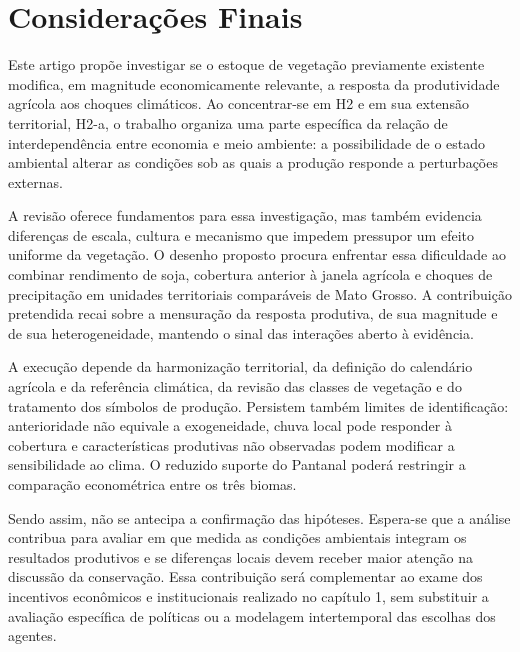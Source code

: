\section{Considerações Finais}

Este artigo propõe investigar se o estoque de vegetação previamente existente modifica, em magnitude economicamente relevante, a resposta da produtividade agrícola aos choques climáticos. Ao concentrar-se em H2 e em sua extensão territorial, H2-a, o trabalho organiza uma parte específica da relação de interdependência entre economia e meio ambiente: a possibilidade de o estado ambiental alterar as condições sob as quais a produção responde a perturbações externas.

A revisão oferece fundamentos para essa investigação, mas também evidencia diferenças de escala, cultura e mecanismo que impedem pressupor um efeito uniforme da vegetação. O desenho proposto procura enfrentar essa dificuldade ao combinar rendimento de soja, cobertura anterior à janela agrícola e choques de precipitação em unidades territoriais comparáveis de Mato Grosso. A contribuição pretendida recai sobre a mensuração da resposta produtiva, de sua magnitude e de sua heterogeneidade, mantendo o sinal das interações aberto à evidência.

A execução depende da harmonização territorial, da definição do calendário agrícola e da referência climática, da revisão das classes de vegetação e do tratamento dos símbolos de produção. Persistem também limites de identificação: anterioridade não equivale a exogeneidade, chuva local pode responder à cobertura e características produtivas não observadas podem modificar a sensibilidade ao clima. O reduzido suporte do Pantanal poderá restringir a comparação econométrica entre os três biomas.

Sendo assim, não se antecipa a confirmação das hipóteses. Espera-se que a análise contribua para avaliar em que medida as condições ambientais integram os resultados produtivos e se diferenças locais devem receber maior atenção na discussão da conservação. Essa contribuição será complementar ao exame dos incentivos econômicos e institucionais realizado no capítulo 1, sem substituir a avaliação específica de políticas ou a modelagem intertemporal das escolhas dos agentes.
